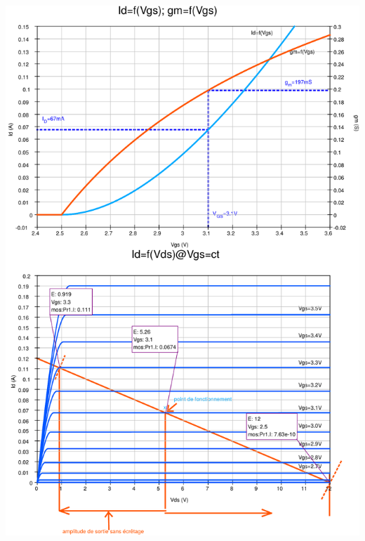 \documentclass{../../template/tp}
\begin{document}
\begin{center}
{\includegraphics[width=15cm]{carac_mos_2k16_corr-crop.pdf}\vspace*{-5cm}}%

\end{center}
\end{document}

